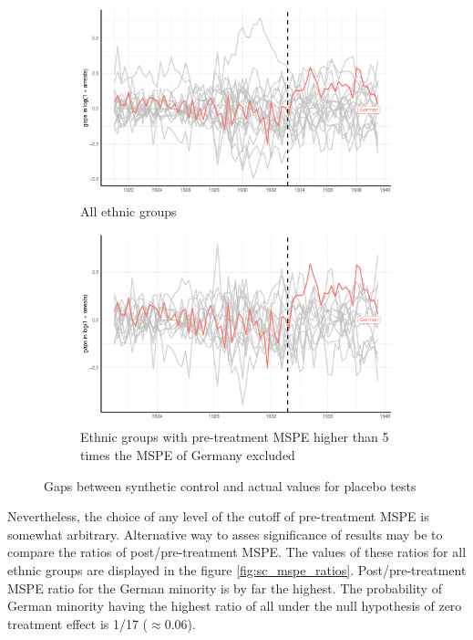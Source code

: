 \begin{figure}[hbtp] 
\begin{subfigure}{\textwidth}
\includegraphics[width=0.9\linewidth]{plots/synthetic_control/until_pact/placebo_highlight_all.pdf}
\caption{All ethnic groups}
\label{fig:sc_placebo_gaps_all}
\end{subfigure}
\begin{subfigure}{\textwidth}
\includegraphics[width=0.9\linewidth]{plots/synthetic_control/until_pact/placebo_highlight_mspe_5_lower.pdf}
\caption{Ethnic groups with pre-treatment MSPE higher than 5 times the MSPE of Germany excluded}
\label{fig:sc_placebo_gaps_all_5_times}
\end{subfigure}
\caption{Gaps between synthetic control and actual values for placebo tests}
\label{fig:sc_placebo_gaps}
\end{figure}

Nevertheless, the choice of any level of the cutoff of pre-treatment MSPE %
is somewhat arbitrary. Alternative way to asses significance of results may be to compare the ratios of  post/pre-treatment MSPE.  The values of these ratios for all ethnic groups are displayed in the figure \ref{fig:sc_mspe_ratios}. Post/pre-treatment MSPE ratio for the German minority is by far the highest. The probability of German minority having the highest ratio of all under the null hypothesis of zero treatment effect is 1/17 ($\approx 0.06$). 

